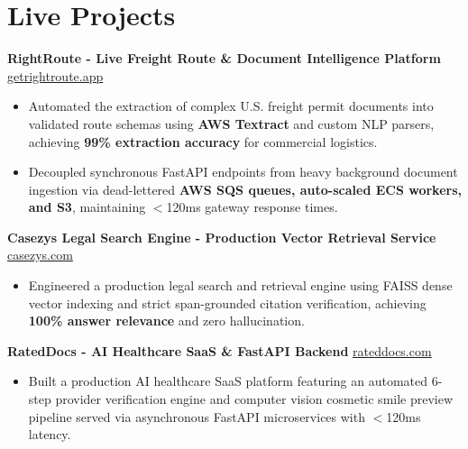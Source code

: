\documentclass[9.5pt,a4paper]{article}
\begin{document}
\section*{Live Projects}
\noindent
\textbf{RightRoute - Live Freight Route & Document Intelligence Platform} \hfill \href{https://getrightroute.app}{getrightroute.app}
\begin{itemize}
    \item Automated the extraction of complex U.S. freight permit documents into validated route schemas using \textbf{AWS Textract} and custom NLP parsers, achieving \textbf{99\% extraction accuracy} for commercial logistics.
    \item Decoupled synchronous FastAPI endpoints from heavy background document ingestion via dead-lettered \textbf{AWS SQS queues, auto-scaled ECS workers, and S3}, maintaining $<$120ms gateway response times.
\end{itemize}
\vspace{0.6pt}
\noindent
\textbf{Casezys Legal Search Engine - Production Vector Retrieval Service} \hfill \href{https://casezys.com}{casezys.com}
\begin{itemize}
    \item Engineered a production legal search and retrieval engine using FAISS dense vector indexing and strict span-grounded citation verification, achieving \textbf{100\% answer relevance} and zero hallucination.
\end{itemize}
\vspace{0.6pt}
\noindent
\textbf{RatedDocs - AI Healthcare SaaS \& FastAPI Backend} \hfill \href{https://rateddocs.com}{rateddocs.com}
\begin{itemize}
    \item Built a production AI healthcare SaaS platform featuring an automated 6-step provider verification engine and computer vision cosmetic smile preview pipeline served via asynchronous FastAPI microservices with $<$120ms latency.
\end{itemize}
\vspace{0.6pt}
\end{document}
